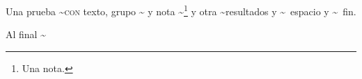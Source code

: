 \documentclass{article}
\begin{document}
Una prueba \textasciitilde \textsc{con} texto, {grupo \textasciitilde} y nota \textasciitilde\footnote{Una nota.} y otra \textasciitilde resultados y \textasciitilde\ espacio y \textasciitilde~fin.

Al final \textasciitilde
\end{document}
